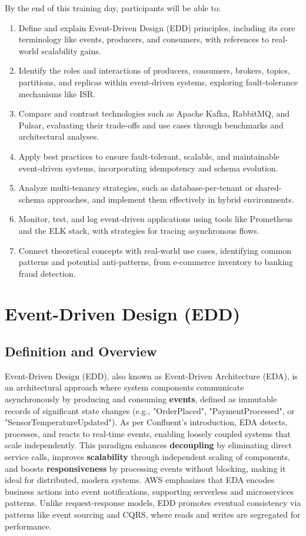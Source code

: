 \documentclass[12pt,a4paper]{report}
\begin{document}
By the end of this training day, participants will be able to:  
\begin{enumerate}
    \item Define and explain Event-Driven Design (EDD) principles, including its core terminology like events, producers, and consumers, with references to real-world scalability gains.
    \item Identify the roles and interactions of producers, consumers, brokers, topics, partitions, and replicas within event-driven systems, exploring fault-tolerance mechanisms like ISR.
    \item Compare and contrast technologies such as Apache Kafka, RabbitMQ, and Pulsar, evaluating their trade-offs and use cases through benchmarks and architectural analyses.
    \item Apply best practices to ensure fault-tolerant, scalable, and maintainable event-driven systems, incorporating idempotency and schema evolution.
    \item Analyze multi-tenancy strategies, such as database-per-tenant or shared-schema approaches, and implement them effectively in hybrid environments.
    \item Monitor, test, and log event-driven applications using tools like Prometheus and the ELK stack, with strategies for tracing asynchronous flows.
    \item Connect theoretical concepts with real-world use cases, identifying common patterns and potential anti-patterns, from e-commerce inventory to banking fraud detection.
\end{enumerate}

\chapter{Event-Driven Design (EDD)}
\section{Definition and Overview}

Event-Driven Design (EDD), also known as Event-Driven Architecture (EDA), is an architectural approach where system components communicate asynchronously by producing and consuming \textbf{events}, defined as immutable records of significant state changes (e.g., "OrderPlaced", "PaymentProcessed", or "SensorTemperatureUpdated"). As per Confluent's introduction, EDA detects, processes, and reacts to real-time events, enabling loosely coupled systems that scale independently. This paradigm enhances \textbf{decoupling} by eliminating direct service calls, improves \textbf{scalability} through independent scaling of components, and boosts \textbf{responsiveness} by processing events without blocking, making it ideal for distributed, modern systems. AWS emphasizes that EDA encodes business actions into event notifications, supporting serverless and microservices patterns. Unlike request-response models, EDD promotes eventual consistency via patterns like event sourcing and CQRS, where reads and writes are segregated for performance.
\end{document}
